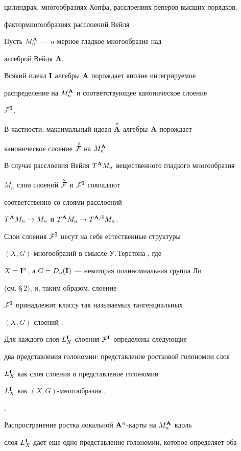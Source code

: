 цилиндрах, многообразиях Хопфа, расслоениях реперов высших порядков,


фактормногообразиях расслоений Вейля \cite{VSh3}.


 


Пусть $M^{\bold A}_n$ --- $n$-мерное гладкое многообразие над


алгеброй Вейля ${\bold A}$.


Всякий идеал ${\bold I}$ алгебры ${\bold A}$ порождает вполне интегрируемое


распределение на $M^{\bold A}_n$ и соответствующее каноническое слоение


${\cal F}^{\bold I}$.


В частности, максимальный идеал $\overset{\circ}{\bold A}{}$ алгебры ${\bold A}$ порождает


каноническое слоение $\overset{\,\circ}{\cal F}{}$ на $M^{\bold A}_n$.


В случае расслоения Вейля $T^{\bold A} M_n$ вещественного гладкого многообразия


$M_n$ слои слоений $\overset{\,\circ}{\cal F}{}$ и ${\cal F}^{\bold I}$ совпадают


соответственно со слоями расслоений


$T^{\bold A} M_n\to M_n$ и $T^{\bold A} M_n\to T^{{\bold A}/{\bold I}}M_n$.


Слои слоения ${\cal F}^{\bold I}$ несут на себе естественные структуры


$(X,G)$-многообразий в смысле У.\,Терстона \cite{Thur}, где


$X={\bold I}^n$, а $G=D_n({\bold I})$ --- некоторая полиномиальная группа Ли


(см. \S\,2), и, таким образом, слоение


${\cal F}^{\bold I}$ принадлежит классу так называемых тангенциальных


$(X,G)$-сло\-ений \cite{Mal3}.


 


Для каждого слоя $L^{\bold I}_X$ слоения ${\cal F}^{\bold I}$ определены следующие


два представления голономии: представление ростковой голономии слоя


$L^{\bold I}_X$ как слоя слоения \cite{Mol} и представление голономии


$L^{\bold I}_X$ как $(X,G)$-многообразия \cite{Thur},


\cite{Apan}.


Распространение ростка локальной ${\bold A}^n$-карты на $M^{\bold A}_n$ вдоль


слоя $L^{\bold I}_X$ дает еще одно представление голономии, которое определяет оба


